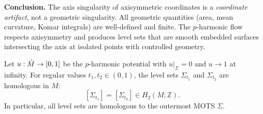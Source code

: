 \begin{remark}
\textbf{Conclusion.} The axis singularity of axisymmetric coordinates is a \emph{coordinate artifact}, not a geometric singularity. All geometric quantities (area, mean curvature, Komar integrals) are well-defined and finite. The $p$-harmonic flow respects axisymmetry and produces level sets that are smooth embedded surfaces intersecting the axis at isolated points with controlled geometry.
\end{remark}

\begin{lemma}\label{lem:homology}
Let $u: \tilde{M} \to [0, 1]$ be the $p$-harmonic potential with $u|_\Sigma = 0$ and $u \to 1$ at infinity. For regular values $t_1, t_2 \in (0, 1)$, the level sets $\Sigma_{t_1}$ and $\Sigma_{t_2}$ are homologous in $M$:
\[
[\Sigma_{t_1}] = [\Sigma_{t_2}] \in H_2(M; \mathbb{Z}).
\]
In particular, all level sets are homologous to the outermost MOTS $\Sigma$.
\end{lemma}

